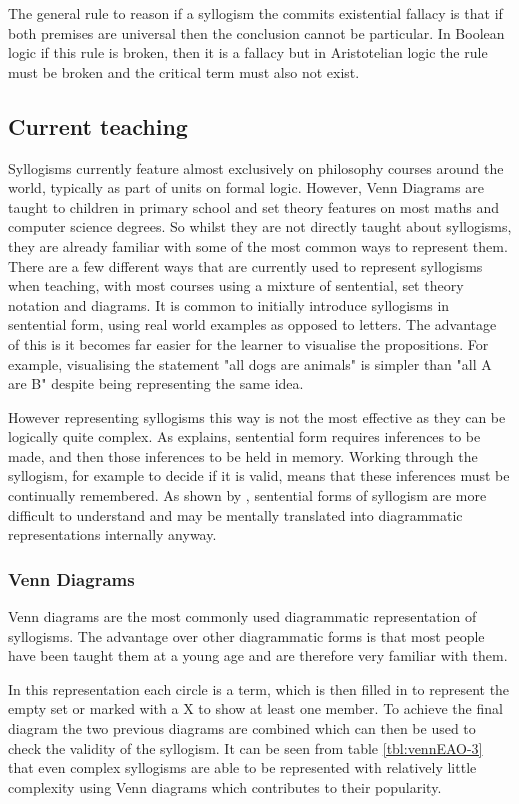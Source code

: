 \documentclass[12pt,a4paper]{report}
\begin{document}
The general rule to reason if a syllogism the commits existential fallacy is that if both premises are universal then the conclusion cannot be particular. In Boolean logic if this rule is broken, then it is a fallacy but in Aristotelian logic the rule must be broken and the critical term must also not exist.

\subsection{Current teaching}
Syllogisms currently feature almost exclusively on philosophy courses around the world, typically as part of units on formal logic. However, Venn Diagrams are taught to children in primary school and set theory features on most maths and computer science degrees. So whilst they are not directly taught about syllogisms, they are already familiar with some of the most common ways to represent them.
There are a few different ways that are currently used to represent syllogisms when teaching, with most courses using a mixture of sentential, set theory notation and diagrams. 
It is common to initially introduce syllogisms in sentential form, using real world examples as opposed to letters. The advantage of this is it becomes far easier for the learner to visualise the propositions. For example, visualising the statement "all dogs are animals" is simpler than "all A are B" despite being representing the same idea. 

However representing syllogisms this way is not the most effective as they can be logically quite complex. As \citep{larkin1987diagram} explains, sentential form requires inferences to be made, and then those inferences to be held in memory. Working through the syllogism, for example to decide if it is valid, means that these inferences must be continually remembered. As shown by \cite{johnson1980mental}, sentential forms of syllogism are more difficult to understand and may be mentally translated into diagrammatic representations internally anyway. 

\subsubsection{Venn Diagrams}
Venn diagrams are the most commonly used diagrammatic representation of syllogisms. The advantage over other diagrammatic forms is that most people have been taught them at a young age and are therefore very familiar with them. 

In this representation each circle is a term, which is then filled in to represent the empty set or marked with a X to show at least one member. To achieve the final diagram the two previous diagrams are combined which can then  be used to check the validity of the syllogism. It can be seen from table \ref{tbl:vennEAO-3} that even complex syllogisms are able to be represented with relatively little complexity using Venn diagrams which contributes to their popularity. 
\end{document}
